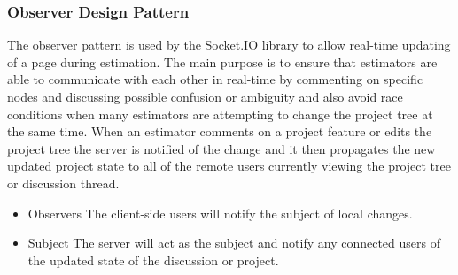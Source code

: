\subsubsection{Observer Design Pattern}
The observer pattern is used by the Socket.IO library to allow real-time updating of a page during estimation. The main purpose is to ensure that estimators are able to communicate with each other in real-time by commenting on specific nodes and discussing possible confusion or ambiguity and also avoid race conditions when many estimators are attempting to change the project tree at the same time. When an estimator comments on a project feature or edits the project tree the server is notified of the change and it then propagates the new updated project state to all of the remote users currently viewing the project tree or discussion thread.
\begin{itemize}
	\item{Observers}
	\newline
	The client-side users will notify the subject of local changes.
	\item{Subject}
	\newline
	The server will act as the subject and notify any connected users of the updated state of the discussion or project.
\end{itemize}